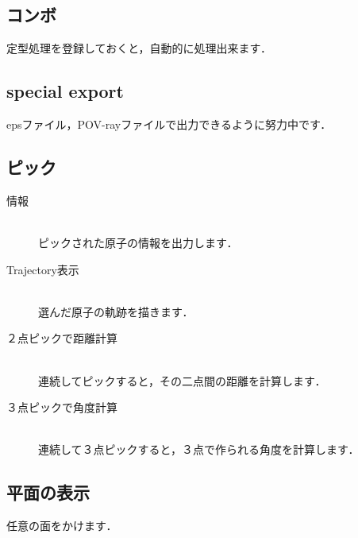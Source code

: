 \documentclass[a4j,openany]{jbook}
\begin{document}
  \subsection*{コンボ}
  定型処理を登録しておくと，自動的に処理出来ます．

  \subsection*{special export}
  epsファイル，POV-rayファイルで出力できるように努力中です．

  \subsection*{ピック}
   \begin{description}
    \item[情報] \mbox{} \\
               ピックされた原子の情報を出力します．
    \item[Trajectory表示] \mbox{} \\
               選んだ原子の軌跡を描きます．
    \item[２点ピックで距離計算] \mbox{} \\
               連続してピックすると，その二点間の距離を計算します．
    \item[３点ピックで角度計算] \mbox{} \\
               連続して３点ピックすると，３点で作られる角度を計算します．
   \end{description}
  \subsection*{平面の表示}
  任意の面をかけます．
\end{document}
